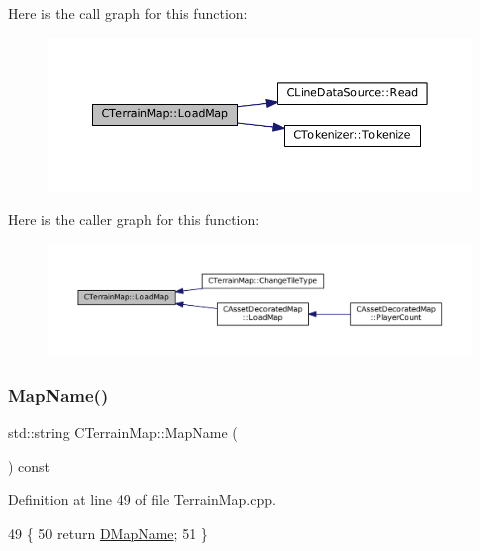Here is the call graph for this function\+:
\nopagebreak
\begin{figure}[H]
\begin{center}
\leavevmode
\includegraphics[width=350pt]{classCTerrainMap_a620258ecf38afb6275c865dad4fc4af4_cgraph}
\end{center}
\end{figure}
Here is the caller graph for this function\+:
\nopagebreak
\begin{figure}[H]
\begin{center}
\leavevmode
\includegraphics[width=350pt]{classCTerrainMap_a620258ecf38afb6275c865dad4fc4af4_icgraph}
\end{center}
\end{figure}
\hypertarget{classCTerrainMap_a2bdc91c2f8d16783992363ea16532dd7}{}\label{classCTerrainMap_a2bdc91c2f8d16783992363ea16532dd7} 
\subsubsection{\texorpdfstring{Map\+Name()}{MapName()}}
{\footnotesize\ttfamily std\+::string C\+Terrain\+Map\+::\+Map\+Name (\begin{DoxyParamCaption}{ }\end{DoxyParamCaption}) const}



Definition at line 49 of file Terrain\+Map.\+cpp.


\begin{DoxyCode}
49                                     \{
50     \textcolor{keywordflow}{return} \hyperlink{classCTerrainMap_a9026e4a5f073885b9e9fc3b43e93caa6}{DMapName};   
51 \}
\end{DoxyCode}
\hypertarget{classCTerrainMap_ad9f476d5d4db6de2907dfa3d4d9de7e6}{}\label{classCTerrainMap_ad9f476d5d4db6de2907dfa3d4d9de7e6} 
